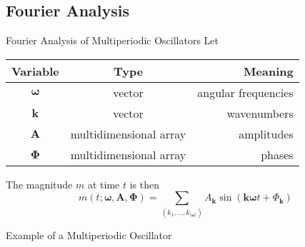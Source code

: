\documentclass[serif,mathserif,professionalfont]{beamer}
\begin{document}
\subsection{Fourier Analysis}
\begin{frame}{Fourier Analysis of Multiperiodic Oscillators}
Let 
\begin{center}
\begin{tabular}{c c r}
\textbf{Variable} & \textbf{Type} & \textbf{Meaning} \\ \hline \hline
$\boldsymbol \omega$ & vector & angular frequencies \\
$\mathbf k$ & vector & wavenumbers \\
$\mathbf A$ & multidimensional array & amplitudes \\ 
$\boldsymbol \Phi$ & multidimensional array & phases \\ \hline
\end{tabular}
\end{center}
The magnitude $m$ at time $t$ is then
$$m(t ; \boldsymbol \omega, \mathbf A, \boldsymbol \Phi) = 
  \sum_{(k_1, \dots, k_{|\boldsymbol \omega|})}
    A_{\mathbf{k}} 
    \sin \left( 
      \mathbf{k} \boldsymbol \omega t + \Phi_{\mathbf{k}}
    \right)$$
\end{frame}

\begin{frame}{Example of a Multiperiodic Oscillator}
\begin{figure}
\centering

\end{figure} 
\end{frame}
\end{document}
